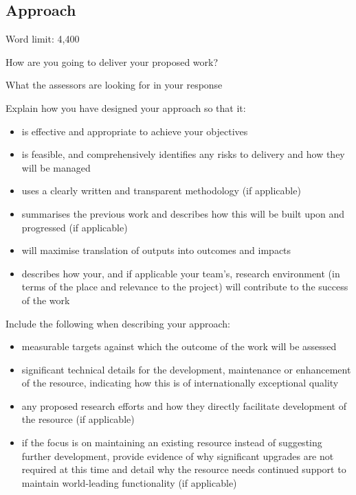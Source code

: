 \documentclass[12in]{article}
\begin{document}
\subsection{Approach}

{\color{red}
Word limit: 4,400

How are you going to deliver your proposed work?

What the assessors are looking for in your response

Explain how you have designed your approach so that it:

\begin{itemize}
	\item is effective and appropriate to achieve your objectives

	\item is feasible, and comprehensively identifies any risks to delivery and how they
will be managed

	\item uses a clearly written and transparent methodology (if applicable)

	\item summarises the previous work and describes how this will be built upon and
progressed (if applicable)

	\item will maximise translation of outputs into outcomes and impacts

	\item describes how your, and if applicable your team’s, research environment (in
terms of the place and relevance to the project) will contribute to the success
of the work

\end{itemize}

Include the following when describing your approach:

\begin{itemize}

	\item measurable targets against which the outcome of the work will be assessed

	\item significant technical details for the development, maintenance or
enhancement of the resource, indicating how this is of internationally
exceptional quality

	\item any proposed research efforts and how they directly facilitate development of
the resource (if applicable)

	\item if the focus is on maintaining an existing resource instead of suggesting
further development, provide evidence of why significant upgrades are not
required at this time and detail why the resource needs continued support to
maintain world-leading functionality (if applicable)


\end{itemize}}
\end{document}
